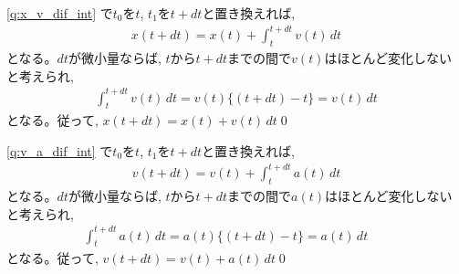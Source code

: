 % 
\ref{q:x_v_dif_int}
で$t_0$を$t$, $t_1$を$t+dt$と置き換えれば, 
\begin{eqnarray}x(t+dt)=x(t)+\int^{t+dt}_{t}v(t)\, dt\end{eqnarray}
となる。$dt$が微小量ならば, $t$から$t+dt$までの間で$v(t)$はほとんど変化しない
と考えられ, 
\begin{eqnarray*}\int^{t+dt}_{t}v(t)\, dt=v(t)\{(t+dt)-t\}=v(t)\,dt\end{eqnarray*}
となる。従って, $x(t+dt)=x(t)+v(t)\,dt$\qed
\hv

% 
\ref{q:v_a_dif_int}
で$t_0$を$t$, $t_1$を$t+dt$と置き換えれば, 
\begin{eqnarray}v(t+dt)=v(t)+\int^{t+dt}_{t}a(t)\, dt\end{eqnarray}
となる。$dt$が微小量ならば, $t$から$t+dt$までの間で$a(t)$はほとんど変化しない
と考えられ, 
\begin{eqnarray*}\int^{t+dt}_{t}a(t)\, dt=a(t)\{(t+dt)-t\}=a(t)\,dt\,\,\,\,\,\,\,\,\,\,\end{eqnarray*}
となる。従って, $v(t+dt)=v(t)+a(t)\,dt$\qed
\hv


